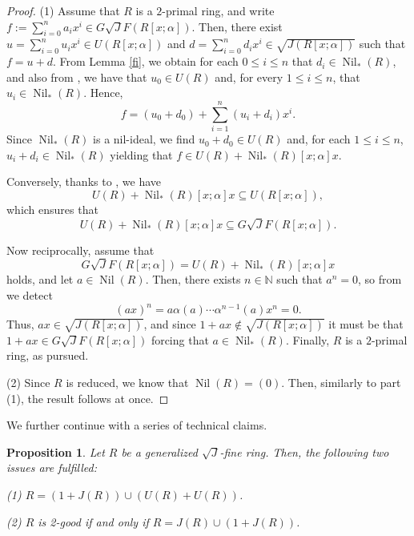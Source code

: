 \documentclass[12pt]{amsart}
\newtheorem{proposition}[theorem]{Proposition}
\theoremstyle{definition}
\begin{document}
\begin{proof}
(1) Assume that $R$ is a $2$-primal ring, and write $f:=\sum_{i=0}^{n}a_ix^i \in G\sqrt{J}F(R[x; \alpha])$. Then, there exist $u=\sum_{i=0}^{n}u_ix^i \in U(R[x; \alpha])$ and $d=\sum_{i=0}^{n}d_ix^i \in \sqrt{J(R[x; \alpha])}$ such that $f=u+d$. From Lemma \ref{fi}, we obtain for each $0\le i\le n$ that $d_i \in \operatorname{Nil}_*(R)$, and also from \cite[Lemma 2.1]{che}, we have that $u_0 \in U(R)$ and, for every $1\le i\le n$, that $u_i \in \operatorname{Nil}_*(R)$. Hence,
\[
f=(u_0+d_0)+\sum_{i=1}^{n}(u_i +d_i)x^i.
\]
Since $\operatorname{Nil}_*(R)$ is a nil-ideal, we find $u_0+d_0 \in U(R)$ and, for each $1\le i\le n$, $u_i+d_i \in \operatorname{Nil}_*(R)$ yielding that $f \in U(R)+\operatorname{Nil}_*(R)[x; \alpha]x$.

Conversely, thanks to \cite[Lemma 2.1]{che}, we have $$U(R)+\operatorname{Nil}_*(R)[x; \alpha]x \subseteq U(R[x; \alpha]),$$ which ensures that $$U(R)+\operatorname{Nil}_*(R)[x; \alpha]x \subseteq G\sqrt{J}F(R[x; \alpha]).$$

Now reciprocally, assume that
\[
G\sqrt{J}F(R[x; \alpha])=U(R)+\operatorname{Nil}_*(R)[x; \alpha]x
\]
holds, and let $a \in \operatorname{Nil}(R)$. Then, there exists $n \in \mathbb{N}$ such that $a^n=0$, so from \cite[Lemma 3.1]{chen} we detect
\[
(ax)^n=a\alpha(a)\cdots \alpha^{n-1}(a)x^n=0.
\]
Thus, $ax \in \sqrt{J(R[x; \alpha])}$, and since $1+ax \notin \sqrt{J(R[x; \alpha])}$ it must be that $1+ax \in G\sqrt{J}F(R[x; \alpha])$ forcing that $a \in \operatorname{Nil}_*(R)$. Finally, $R$ is a $2$-primal ring, as pursued.

(2) Since $R$ is reduced, we know that $\operatorname{Nil}(R)=(0)$. Then, similarly to part (1), the result follows at once.
\end{proof}

We further continue with a series of technical claims.

\begin{proposition}\label{2.13}
Let \( R \) be a generalized \(\sqrt{J}\)-fine ring. Then, the following two issues are fulfilled:

(1) \( R = (1 + J(R)) \cup (U(R) + U(R)) \).

(2) \( R \) is 2-good if and only if \( R = J(R) \cup (1 + J(R)) \).
\end{proposition}
\end{document}
